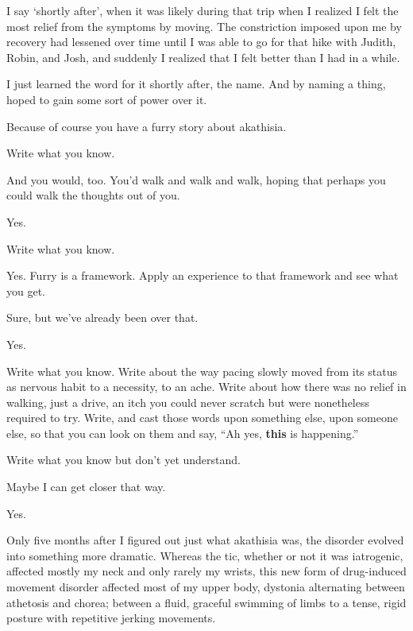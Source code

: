 \begin{paracol}{2}
\begin{leftcolumn}
I say `shortly after', when it was likely during that trip when I realized I felt the most relief from the symptoms by moving. The constriction imposed upon me by recovery had lessened over time until I was able to go for that hike with Judith, Robin, and Josh, and suddenly I realized that I felt better than I had in a while.

I just learned the word for it shortly after, the name. And by naming a thing, hoped to gain some sort of power over it.

\begin{ally}
Because of course you have a furry story about akathisia.
\end{ally}
Write what you know.

\begin{ally}
And you would, too. You'd walk and walk and walk, hoping that perhaps you could walk the thoughts out of you.
\end{ally}
Yes.

\begin{ally}
Write what you know.
\end{ally}
Yes. Furry is a framework. Apply an experience to that framework and see what you get.

\begin{ally}
Sure, but we've already been over that.
\end{ally}
Yes.

\begin{ally}
Write what you know. Write about the way pacing slowly moved from its status as nervous habit to a necessity, to an ache. Write about how there was no relief in walking, just a drive, an itch you could never scratch but were nonetheless required to try. Write, and cast those words upon something else, upon someone else, so that you can look on them and say, ``Ah yes, \textbf{this} is happening.''
\end{ally}
\begin{ally}
Write what you know but don't yet understand.
\end{ally}
Maybe I can get closer that way.

\begin{ally}
Yes.
\end{ally}
\newpage

\noindent Only five months after I figured out just what akathisia was, the disorder evolved into something more dramatic. Whereas the tic, whether or not it was iatrogenic, affected mostly my neck and only rarely my wrists, this new form of drug-induced movement disorder affected most of my upper body, dystonia alternating between athetosis and chorea; between a fluid, graceful swimming of limbs to a tense, rigid posture with repetitive jerking movements.


\end{leftcolumn}
\end{paracol}
